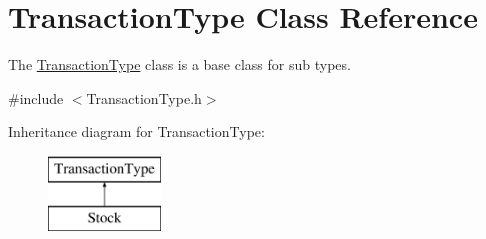 \hypertarget{class_transaction_type}{}\section{Transaction\+Type Class Reference}
\label{class_transaction_type}


The \mbox{\hyperlink{class_transaction_type}{Transaction\+Type}} class is a base class for sub types.  




{\ttfamily \#include $<$Transaction\+Type.\+h$>$}

Inheritance diagram for Transaction\+Type\+:\begin{figure}[H]
\begin{center}
\leavevmode
\includegraphics[height=2.000000cm]{class_transaction_type}
\end{center}
\end{figure}
